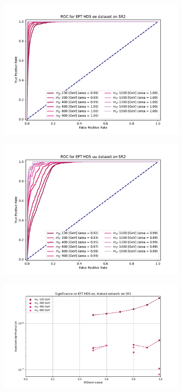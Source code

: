 \documentclass[12pt, a4paper]{book}
\begin{document}
\begin{figure}[!ht]
\begin{subfigure}[b]{0.49\textwidth}
      \includegraphics[width=1\textwidth]{XGBoost/Model_independent/100-150/EFT_HDS/ROC_ee.pdf}
   \end{subfigure}
   \hfill
   \begin{subfigure}[b]{0.49\textwidth}
      \centering
      \includegraphics[width=1\textwidth]{XGBoost/Model_independent/100-150/EFT_HDS/ROC_uu.pdf}
   \end{subfigure}
   \hfill
	\begin{subfigure}[b]{0.49\textwidth}
      \centering
      \includegraphics[width=1\textwidth]{XGBoost/Model_independent/100-150/EFT_HDS/EXP_SIG_ee.pdf}

\end{subfigure}
\end{figure}
\end{document}
